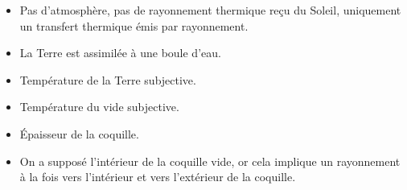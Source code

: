 \documentclass[a4paper,12pt]{article}
\begin{document}
\begin{itemize}
    \item Pas d’atmosphère, pas de rayonnement thermique reçu du Soleil, uniquement un transfert thermique émis par rayonnement.
    \item La Terre est assimilée à une boule d’eau.
    \item Température de la Terre subjective.
    \item Température du vide subjective.
    \item Épaisseur de la coquille.
    \item On a supposé l'intérieur de la coquille vide, or cela implique un rayonnement à la fois vers l'intérieur et vers l'extérieur de la coquille.
\end{itemize}  
\end{document}
